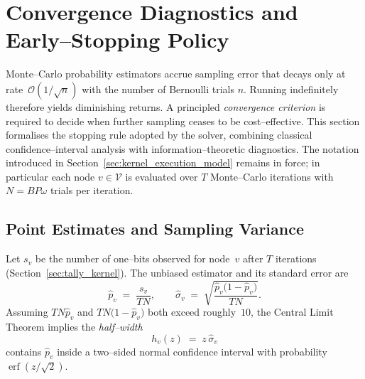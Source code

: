 \section{Convergence Diagnostics and Early--Stopping Policy}
\label{sec:convergence_criterion}

Monte--Carlo probability estimators accrue sampling error that decays only at
rate~$\mathcal{O}(1/\sqrt{n})$ with the number of Bernoulli trials $n$.
Running indefinitely therefore yields diminishing returns.
A principled \emph{convergence criterion} is required to decide when further
sampling ceases to be cost--effective.  This section formalises the stopping
rule adopted by the solver, combining classical confidence--interval analysis
with information--theoretic diagnostics.  The notation introduced in
Section~\ref{sec:kernel_execution_model} remains in force; in particular each
node $v\!\in\!\mathcal{V}$ is evaluated over $T$ Monte--Carlo iterations with
$N\!=\!B P \omega$ trials per iteration.

\subsection{Point Estimates and Sampling Variance}
\label{subsec:conv_point_estimates}

Let $s_v$ be the number of one--bits observed for node~$v$ after $T$ iterations
(Section~\ref{sec:tally_kernel}).  The unbiased estimator and its standard
error are
\begin{equation}
  \widehat{p}_v \;=\; \frac{s_v}{T N},
  \qquad
  \widehat{\sigma}_v \;=\;
  \sqrt{\frac{\widehat{p}_v\bigl(1-\widehat{p}_v\bigr)}{T N}}.
  \label{eq:p_hat_sigma_hat}
\end{equation}
Assuming $T N \widehat{p}_v$ and $T N\bigl(1-\widehat{p}_v\bigr)$ both exceed
roughly~$10$, the Central Limit Theorem implies the \emph{half--width}
\begin{equation}
  h_v(z) \;=\; z\,\widehat{\sigma}_v
  \label{eq:half_width}
\end{equation}
contains $\widehat{p}_v$ inside a two--sided normal confidence interval with
probability $\operatorname{erf}(z/\sqrt{2})$.

